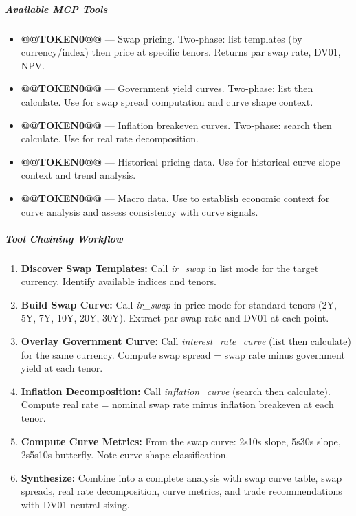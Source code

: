 \documentclass[11pt]{article}
\begin{document}
\subparagraph{Available MCP Tools}\mbox{}\par

\begin{itemize}[leftmargin=*,itemsep=2pt,topsep=2pt]
\item {} \textbf{@@TOKEN0@@} — Swap pricing. Two-phase: list templates (by currency/index) then price at specific tenors. Returns par swap rate, DV01, NPV.
\item {} \textbf{@@TOKEN0@@} — Government yield curves. Two-phase: list then calculate. Use for swap spread computation and curve shape context.
\item {} \textbf{@@TOKEN0@@} — Inflation breakeven curves. Two-phase: search then calculate. Use for real rate decomposition.
\item {} \textbf{@@TOKEN0@@} — Historical pricing data. Use for historical curve slope context and trend analysis.
\item {} \textbf{@@TOKEN0@@} — Macro data. Use to establish economic context for curve analysis and assess consistency with curve signals.
\end{itemize}

\subparagraph{Tool Chaining Workflow}\mbox{}\par

\begin{enumerate}[leftmargin=*,itemsep=2pt,topsep=2pt]
\item {} \textbf{Discover Swap Templates:} Call \emph{ir\_\allowbreak{}swap} in list mode for the target currency. Identify available indices and tenors.
\item {} \textbf{Build Swap Curve:} Call \emph{ir\_\allowbreak{}swap} in price mode for standard tenors (2Y, 5Y, 7Y, 10Y, 20Y, 30Y). Extract par swap rate and DV01 at each point.
\item {} \textbf{Overlay Government Curve:} Call \emph{interest\_\allowbreak{}rate\_\allowbreak{}curve} (list then calculate) for the same currency. Compute swap spread = swap rate minus government yield at each tenor.
\item {} \textbf{Inflation Decomposition:} Call \emph{inflation\_\allowbreak{}curve} (search then calculate). Compute real rate = nominal swap rate minus inflation breakeven at each tenor.
\item {} \textbf{Compute Curve Metrics:} From the swap curve: 2s10s slope, 5s30s slope, 2s5s10s butterfly. Note curve shape classification.
\item {} \textbf{Synthesize:} Combine into a complete analysis with swap curve table, swap spreads, real rate decomposition, curve metrics, and trade recommendations with DV01-neutral sizing.
\end{enumerate}
\end{document}
